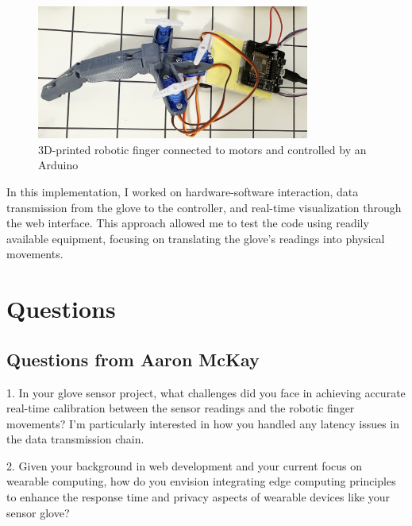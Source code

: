\begin{figure}[h]
  \centering
  \includegraphics[width=0.80\textwidth]{images/physical-device.png}
  \caption{3D-printed robotic finger connected to motors and controlled by an Arduino}
  \label{fig:marwan:3d}
\end{figure}

In this implementation, I worked on hardware-software interaction, data transmission from the glove to the controller, and real-time visualization through the web interface. This approach allowed me to test the code using readily available equipment, focusing on translating the glove's readings into physical movements.

\section{Questions}
\subsection{Questions from Aaron McKay}
1. In your glove sensor project, what challenges did you face in achieving accurate real-time calibration between the sensor readings and the robotic finger movements? I'm particularly interested in how you handled any latency issues in the data transmission chain.

2. Given your background in web development and your current focus on wearable computing, how do you envision integrating edge computing principles to enhance the response time and privacy aspects of wearable devices like your sensor glove?